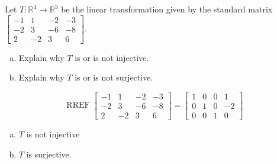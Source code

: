 
\begin{exerciseStatement}
 Let \(T:\mathbb{R}^ 4  \to \mathbb{R}^ 3 \) be the linear transformation given by the standard matrix \( \left[\begin{array}{cccc}
-1 & 1 & -2 & -3 \\
-2 & 3 & -6 & -8 \\
2 & -2 & 3 & 6
\end{array}\right] .\)
\begin{enumerate}[(a)]
\item Explain why \(T\) is or is not injective.
\item Explain why \(T\) is or is not surjective.
\end{enumerate}
    
\end{exerciseStatement}
    
\begin{exerciseAnswer} 


\[\operatorname{RREF} \left[\begin{array}{cccc}
-1 & 1 & -2 & -3 \\
-2 & 3 & -6 & -8 \\
2 & -2 & 3 & 6
\end{array}\right] = \left[\begin{array}{cccc}
1 & 0 & 0 & 1 \\
0 & 1 & 0 & -2 \\
0 & 0 & 1 & 0
\end{array}\right] \]


\begin{enumerate}[(a)]
\item \(T\) is not injective
\item \(T\) is surjective.
\end{enumerate}
    
\end{exerciseAnswer}
    
